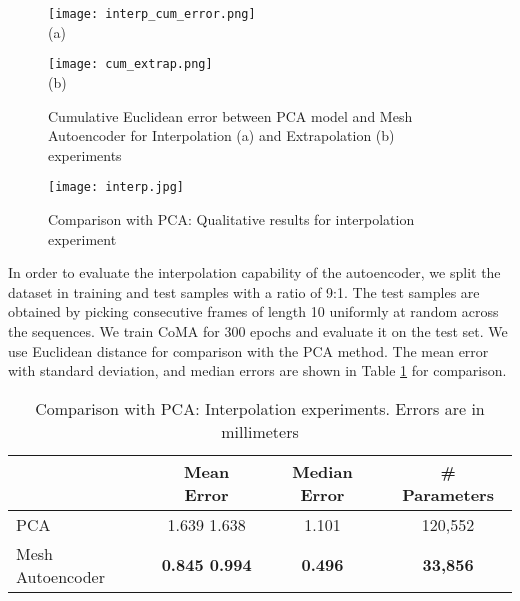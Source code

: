 \begin{figure}[t]
  \begin{minipage}[b]{0.5\textwidth}
    \begin{center}
    \texttt{[image: interp\_cum\_error.png]} \\
    (a)
    \end{center}
\end{minipage}
 \hfil
  \begin{minipage}[b]{0.5\textwidth}
    \begin{center}
    \texttt{[image: cum\_extrap.png]} \\
    (b)
	\end{center}
\end{minipage}
\caption{Cumulative Euclidean error between PCA model and Mesh Autoencoder for Interpolation (a) and Extrapolation (b) experiments}
    \label{fig:cum_error1}
\end{figure}


\begin{figure}[t]
\begin{center}
\texttt{[image: interp.jpg]}
\end{center}
\vspace{-4mm}
\caption{Comparison with PCA: Qualitative results for interpolation experiment}
\label{fig:interp}
\end{figure}

In order to evaluate the interpolation capability of the autoencoder, we split the dataset in training and test samples with a ratio of 9:1. The test samples are obtained by picking consecutive frames of length 10  uniformly at random across the sequences. We train CoMA for 300 epochs and evaluate it on the test set. We use Euclidean distance for comparison with the PCA method. The mean error with standard deviation, and median errors are shown in Table \ref{tab:interp} for comparison.

\begin{table}
\begin{center}
\caption{Comparison with PCA: Interpolation experiments. Errors are in millimeters}
\begin{tabular}{l|cc|c}
     &  Mean Error      & Median Error & \# Parameters \\ \hline
PCA  & 1.639  1.638 & 1.101& 120,552 \\
Mesh Autoencoder  & \textbf{0.845  0.994} & \textbf{0.496}  & \textbf{33,856}\\
\end{tabular}
\label{tab:interp}
\end{center}
\end{table}

